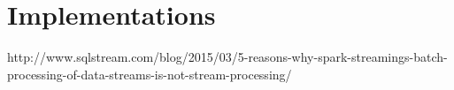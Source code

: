 
\chapter{Implementations}

\ifpdf
    \graphicspath{{Chapter5/Figs/Raster/}{Chapter5/Figs/PDF/}{Chapter5/Figs/}}
\else
    \graphicspath{{Chapter5/Figs/Vector/}{Chapter5/Figs/}}
\fi



http://www.sqlstream.com/blog/2015/03/5-reasons-why-spark-streamings-batch-processing-of-data-streams-is-not-stream-processing/